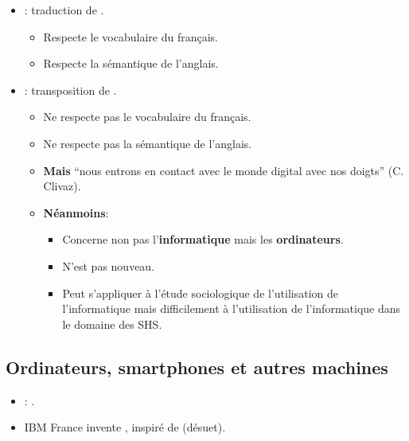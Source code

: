 \begin{slide}
	\begin{itemize}
		\item {} : traduction de .
		\begin{itemize}
			\item Respecte le vocabulaire du français.
			\item Respecte la sémantique de l'anglais.
		\end{itemize}
		
		\item {} : transposition de .
			\begin{itemize}
				\item Ne respecte pas le vocabulaire du français.
				\item Ne respecte pas la sémantique de l'anglais.
				\item \textbf{Mais} \enquote{nous entrons en contact avec le monde digital avec nos doigts} (C. Clivaz). %

				\item \textbf{Néanmoins}: %
				\begin{itemize}
					\item Concerne non pas l'\textbf{informatique} mais les \textbf{ordinateurs}.
					\item N'est pas nouveau.
					\item Peut s'appliquer à l'étude sociologique de l'utilisation de l'informatique mais difficilement à l'utilisation de l'informatique dans le domaine des SHS.
				\end{itemize}
			\end{itemize}
	\end{itemize}
\end{slide}
\subsection{Ordinateurs, smartphones et autres machines}

\begin{slide}
	\begin{itemize}
		\item {}: .
		\item IBM France invente , inspiré de  (désuet).
	\end{itemize}
\end{slide}

